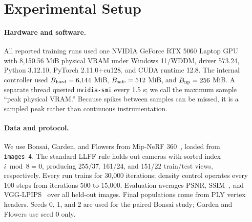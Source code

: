 \section{Experimental Setup}
\paragraph{Hardware and software.}
All reported training runs used one NVIDIA GeForce RTX 5060 Laptop GPU with 8,150.56 MiB physical VRAM under Windows 11/WDDM, driver 573.24, Python 3.12.10, PyTorch 2.11.0+cu128, and CUDA runtime 12.8. The internal controller used $B_{\rm hard}=6{,}144$ MiB, $B_{\rm safe}=512$ MiB, and $B_{\rm np}=256$ MiB. A separate thread queried \texttt{nvidia-smi} every 1.5 s; we call the maximum sample ``peak physical VRAM.'' Because spikes between samples can be missed, it is a sampled peak rather than continuous instrumentation.

\paragraph{Data and protocol.}
We use Bonsai, Garden, and Flowers from Mip-NeRF 360~\cite{barron2022mipnerf360}, loaded from \texttt{images\_4}. The standard LLFF rule holds out cameras with sorted index $i\bmod 8=0$, producing 255/37, 161/24, and 151/22 train/test views, respectively. Every run trains for 30,000 iterations; density control operates every 100 steps from iterations 500 to 15,000. Evaluation averages PSNR, SSIM~\cite{wang2004ssim}, and VGG-LPIPS~\cite{zhang2018lpips} over all held-out images. Final populations come from PLY vertex headers. Seeds 0, 1, and 2 are used for the paired Bonsai study; Garden and Flowers use seed 0 only.

\begin{table}[t]
\centering\scriptsize
\caption{2x2 factorial configurations. ``Preserve'' is the admission-coupled lifecycle described in Sec.~3.3.}
\label{tab:configs}
\end{table}

